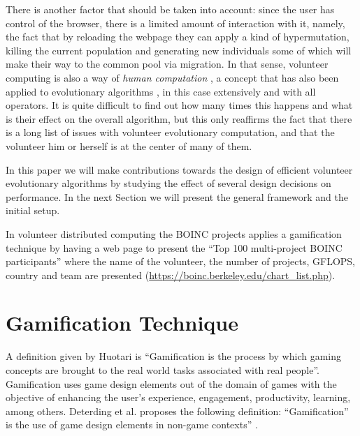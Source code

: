 \documentclass{llncs}
\begin{document}
There is another factor that should be taken into account: since the
user has control of the browser, there is a limited amount of
interaction with it, namely, the fact that by reloading the webpage they
can apply a kind of hypermutation, killing the current population and
generating new individuals some of which will make their way to the
common pool via migration. In that sense, volunteer computing is also
a way of {\em human computation} \cite{quinn2011human}, a concept that
has also been applied to evolutionary algorithms \cite{972056}, in
this case extensively and with all operators. It is quite difficult to
find out how many times this happens and what is their effect on the
overall algorithm, but this only reaffirms the fact that there is a
long list of issues with volunteer evolutionary computation, and that
the volunteer him or herself is at the center of many of them.

In this paper we will make contributions towards the design of
efficient volunteer evolutionary algorithms by studying the effect of
several design decisions on performance. In the next Section we will
present the general framework and the initial setup.

In volunteer distributed computing the BOINC projects applies a gamification technique 
by having a web page to present the ``Top 100 multi-project BOINC participants'' where
the name of the volunteer, the number of projects, GFLOPS, country and team are presented 
(\url{https://boinc.berkeley.edu/chart_list.php}). 


\section{Gamification Technique}
\label{sec:gamification}
A definition given by Huotari  \cite{huotari2012defining} is ``Gamification is
the process by which gaming concepts are brought to the real world tasks associated with
real people''. Gamification uses game design elements out of the domain of games 
with the objective of enhancing the user's experience, engagement, productivity, 
learning, among others. Deterding et al. proposes the following definition:
 ``Gamification” is the use of game design elements in non-game contexts'' 
 \cite{deterding2011gamification}.
\end{document}
